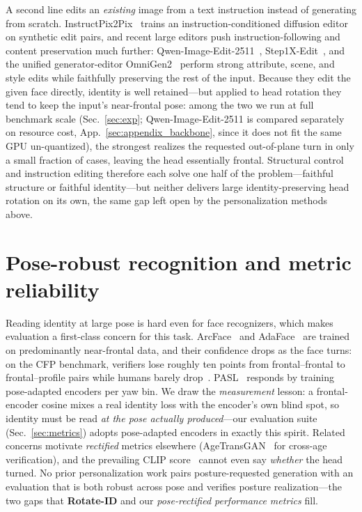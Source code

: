 A second line edits an \emph{existing} image from a text instruction instead of generating from scratch. InstructPix2Pix~\cite{instructpix2pix} trains an instruction-conditioned diffusion editor on synthetic edit pairs, and recent large editors push instruction-following and content preservation much further: Qwen-Image-Edit-2511~\cite{qwenimageedit}, Step1X-Edit~\cite{step1xedit}, and the unified generator-editor OmniGen2~\cite{omnigen2} perform strong attribute, scene, and style edits while faithfully preserving the rest of the input. Because they edit the given face directly, identity is well retained---but applied to head rotation they tend to keep the input's near-frontal pose: among the two we run at full benchmark scale (Sec.~\ref{sec:exp}; Qwen-Image-Edit-2511 is compared separately on resource cost, App.~\ref{sec:appendix_backbone}, since it does not fit the same GPU un-quantized), the strongest realizes the requested out-of-plane turn in only a small fraction of cases, leaving the head essentially frontal. Structural control and instruction editing therefore each solve one half of the problem---faithful structure or faithful identity---but neither delivers large identity-preserving head rotation on its own, the same gap left open by the personalization methods above.

\section{Pose-robust recognition and metric reliability}
Reading identity at large pose is hard even for face recognizers, which makes
evaluation a first-class concern for this task. ArcFace~\cite{arcface} and
AdaFace~\cite{adaface} are trained on predominantly near-frontal data, and
their confidence drops as the face turns: on the CFP benchmark, verifiers lose
roughly ten points from frontal--frontal to frontal--profile pairs while humans
barely drop~\cite{cfp}. PASL~\cite{pasl} responds by training pose-adapted
encoders per yaw bin. We draw the \emph{measurement} lesson: a frontal-encoder
cosine mixes a real identity loss with the encoder's own blind spot, so
identity must be read \emph{at the pose actually produced}---our evaluation
suite (Sec.~\ref{sec:metrics}) adopts pose-adapted encoders in exactly this
spirit. Related concerns motivate
\emph{rectified} metrics elsewhere (AgeTransGAN~\cite{agetransgan} for
cross-age verification), and the prevailing CLIP score~\cite{clipscore} cannot
even say \emph{whether} the head turned. No prior personalization work pairs
posture-requested generation with an evaluation that is both robust across pose
and verifies posture realization---the two gaps that \textbf{Rotate-ID} and
our \emph{pose-rectified performance metrics} fill.

